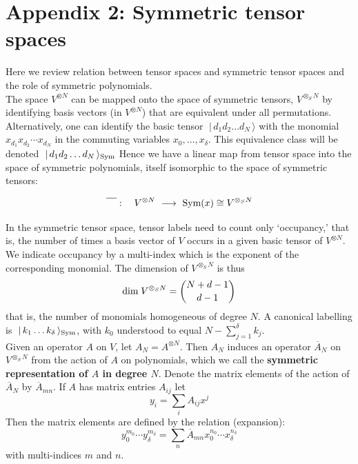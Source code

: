 \documentclass[12pt]{article}    %
\def\dir#1.{\;|\, #1 \,\rangle}             %
\def\dirs#1.{\;|\, #1 \,\rangle_{\rm Sym}}  %
\begin{document}
\section*{Appendix 2: Symmetric tensor spaces}
\label{sec:A2}

Here we review relation between tensor spaces and symmetric tensor spaces
and the role of symmetric polynomials.
\\

 
The space $V^{\otimes N}$ can be mapped onto the space of symmetric
tensors, $V^{\otimes_S N}$ by identifying basis vectors 
(in $V^{\otimes N}$) that are equivalent under all permutations. 
Alternatively, one can identify the basic tensor
$\dir d_1d_2\ldots d_N.$ with the monomial $x_{d_1}x_{d_2}\cdots x_{d_N}$
in the commuting variables $x_0,\ldots,x_\delta$. 
This equivalence class will be denoted $\dirs d_1d_2\ldots d_N.$ 
Hence we have a linear map
from tensor space into the space of symmetric polynomials, itself 
isomorphic to the space of symmetric tensors:

\begin{equation}
\label{eq:proj}
  \overline{\phantom{W}}:\quad V^{\otimes N} 
                \ \longrightarrow \ 
                \hbox{Sym}(x)  \cong V^{\otimes_S N}
\end{equation}

In the symmetric tensor space, tensor labels
need to count only `occupancy,' that is, the number of times a
basis vector of $V$ occurs in a given basic tensor of $V^{\otimes N}$. 
We indicate occupancy by a multi-index which is the exponent of the
corresponding monomial. 
The dimension of $V^{\otimes_S N}$ is thus
$$
     \hbox{dim}\; V^{\otimes_S N} = {N+d-1\choose d-1}
$$
that is, the number of monomials homogeneous of degree $N$. 
A canonical labelling is $\dirs k_1\ldots k_\delta.$, 
with $k_0$ understood to equal $N-\sum\limits_{j=1}^\delta k_j$. 
\\

Given an operator $A$ on $V$, let $A_N=A^{\otimes N}$. Then $A_N$  
induces an operator $\overline{A}_N$ on $V^{\otimes_S N}$ from the action of
$A$ on polynomials,  which we call the {\bf symmetric representation 
of $A$ in degree $N$}.  Denote the matrix elements of the action of
$\overline{A}_N$ by $\overline{A}_{mn}$. If $A$ has matrix entries
$A_{ij}$ let
$$
       y_i=\sum_i A_{ij}x^j
$$
Then the matrix elements are defined by the relation (expansion):
$$
   y_0^{m_0}\cdots y_\delta^{m_\delta}=
               \sum_n \overline{A}_{mn}
                     x_0^{n_0}\cdots x_\delta^{n_\delta}
$$
with multi-indices $m$ and $n$.
\\
\end{document}
